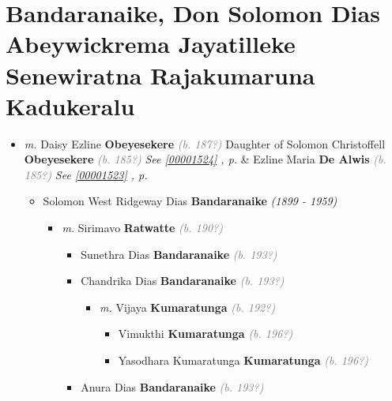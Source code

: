 \documentclass[10pt, openany]{book}
\begin{document}
\chapter{Bandaranaike, Don Solomon Dias Abeywickrema Jayatilleke Senewiratna Rajakumaruna Kadukeralu}
\label{00001526}
\textcolor{slmaroon}{\textit{}}
\begin{itemize}
\item{\textit{m.} Daisy Ezline \textbf{Obeyesekere} \textcolor{gray}{\textit{(b. 187?)}} Daughter of  Solomon Christoffell \textbf{Obeyesekere} \textcolor{gray}{\textit{(b. 185?)}} \textcolor{slteal}{\textit{See  \autoref{00001524} \textit{, p. \pageref{00001524} }}}  \&  Ezline Maria \textbf{De Alwis} \textcolor{gray}{\textit{(b. 185?)}} \textcolor{slteal}{\textit{See  \autoref{00001523} \textit{, p. \pageref{00001523} }}}   \label{couple:00001525:00001526} \begin{itemize}
\item{Solomon West Ridgeway Dias \textbf{Bandaranaike} \textcolor{slorange}{\textit{(1899 - 1959)}}
\begin{itemize}
\item{\textit{m.} Sirimavo \textbf{Ratwatte} \textcolor{gray}{\textit{(b. 190?)}}   \label{couple:00001527:00001528} \begin{itemize}
\item{Sunethra Dias \textbf{Bandaranaike} \textcolor{gray}{\textit{(b. 193?)}}
  }
\item{Chandrika Dias \textbf{Bandaranaike} \textcolor{gray}{\textit{(b. 193?)}}
\begin{itemize}
\item{\textit{m.} Vijaya \textbf{Kumaratunga} \textcolor{gray}{\textit{(b. 192?)}}   \label{couple:00001532:00001533} \begin{itemize}
\item{Vimukthi \textbf{Kumaratunga} \textcolor{gray}{\textit{(b. 196?)}}
 }
\item{Yasodhara Kumaratunga \textbf{Kumaratunga} \textcolor{gray}{\textit{(b. 196?)}}
  }
\end{itemize}}
\end{itemize}
  }
\item{Anura Dias \textbf{Bandaranaike} \textcolor{gray}{\textit{(b. 193?)}}
  }
\end{itemize}}

\end{itemize}}
\end{itemize}}
\end{itemize}
\end{document}
